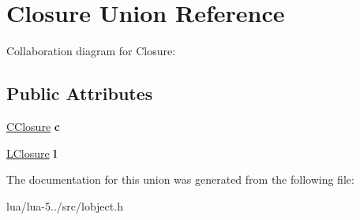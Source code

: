 \hypertarget{union_closure}{\section{Closure Union Reference}
\label{union_closure}
}


Collaboration diagram for Closure\+:
\subsection*{Public Attributes}
\begin{DoxyCompactItemize}
\item 
\hypertarget{union_closure_ace9dac5a62b61db682ef0cd86b3b44b1}{\hyperlink{struct_c_closure}{C\+Closure} {\bfseries c}}\label{union_closure_ace9dac5a62b61db682ef0cd86b3b44b1}

\item 
\hypertarget{union_closure_a8c338ec7dc76078cbee5887857de713c}{\hyperlink{struct_l_closure}{L\+Closure} {\bfseries l}}\label{union_closure_a8c338ec7dc76078cbee5887857de713c}

\end{DoxyCompactItemize}


The documentation for this union was generated from the following file\+:\begin{DoxyCompactItemize}
\item 
lua/lua-\/5../src/lobject.\+h\end{DoxyCompactItemize}
